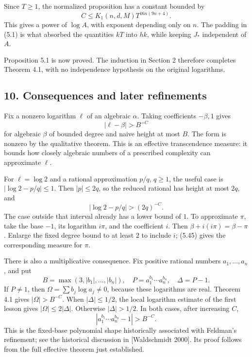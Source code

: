 \documentclass[
  11pt,
  a4paper,
]{article}
\begin{document}
Since \(T\ge1\), the normalized proposition has a constant bounded by \[
C\le K_1(n,d,M)T^{16n(9n+4)}. \tag{5.40}
\] This gives a power of \(\log A\), with exponent depending only on
\(n\). The padding in (5.1) is what absorbed the quantities \(kT\) into
\(hk\), while keeping \(J_*\) independent of \(A\).

Proposition 5.1 is now proved. The induction in Section 2 therefore
completes Theorem 4.1, with no independence hypothesis on the original
logarithms.

\subsection{10. Consequences and later
refinements}\label{consequences-and-later-refinements}

Fix a nonzero logarithm \(\ell\) of an algebraic \(\alpha\). Taking
coefficients \(-\beta,1\) gives \[
|\ell-\beta|>B^{-C} \tag{5.45}
\] for algebraic \(\beta\) of bounded degree and naive height at most
\(B\). The form is nonzero by the qualitative theorem. This is an
effective transcendence measure: it bounds how closely algebraic numbers
of a prescribed complexity can approximate \(\ell\).

For \(\ell=\log2\) and a rational approximation \(p/q\), \(q\ge1\), the
useful case is \(|\log2-p/q|\le1\). Then \(|p|\le2q\), so the reduced
rational has height at most \(2q\), and \[
|\log2-p/q|>(2q)^{-C}. \tag{5.46}
\] The case outside that interval already has a lower bound of \(1\). To
approximate \(\pi\), take the base \(-1\), its logarithm \(i\pi\), and
the coefficient \(i\). Then \(\beta+i(i\pi)=\beta-\pi\). Enlarge the
fixed degree bound to at least \(2\) to include \(i\); (5.45) gives the
corresponding measure for \(\pi\).

There is also a multiplicative consequence. Fix positive rational
numbers \(a_1,\ldots,a_n\), and put \[
B=\max(3,|b_1|,\ldots,|b_n|),\quad
P=a_1^{b_1}\cdots a_n^{b_n},\quad \Delta=P-1.
\] If \(P\ne1\), then \(\Omega=\sum b_j\log a_j\ne0\), because these
logarithms are real. Theorem 4.1 gives \(|\Omega|>B^{-C}\). When
\(|\Delta|\le1/2\), the local logarithm estimate of the first lesson
gives \(|\Omega|\le2|\Delta|\). Otherwise \(|\Delta|>1/2\). In both
cases, after increasing \(C\), \[
|a_1^{b_1}\cdots a_n^{b_n}-1|>B^{-C}. \tag{5.47}
\] This is the fixed-base polynomial shape historically associated with
Feldman's refinement; see the historical discussion in {[}Waldschmidt
2000{]}. Its proof follows from the full effective theorem just
established.
\end{document}
